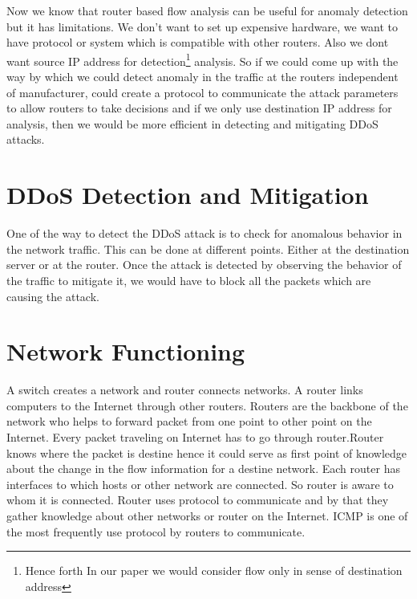 \documentclass[10pt,oneside,a4paper]{article}
\begin{document}
Now we know that router based flow analysis can be useful for anomaly detection but it has limitations. We don't want to set up expensive hardware, we want to have protocol or system which is compatible with other routers. Also we dont want source IP address for detection\footnote{Hence forth In our paper we would consider flow only in sense of destination address} analysis. So if we could come up with the way by which we could detect anomaly in the traffic at the routers independent of manufacturer, could create a protocol to communicate the attack parameters to allow routers to take decisions and if we only use destination IP address for analysis, then we would be more efficient in detecting and mitigating DDoS attacks.

\section{DDoS Detection and Mitigation}

One of the way to detect the DDoS attack is to check for anomalous behavior in the network traffic. This can be done at different points. Either at the destination server or at the router. Once the attack is detected by observing the behavior of the traffic to mitigate it, we would have to block all the packets which are causing the attack.

\section{Network Functioning}
A switch creates a network and router connects networks. A router links computers to the Internet through other routers. Routers are the backbone of the network who helps to forward packet from one point to other point on the Internet. Every packet traveling on Internet has to go through router\cite{swithcrouter}.Router knows where the packet is destine hence it could serve as first point of knowledge about the change in the flow information for a destine network. Each router has interfaces to which hosts or other network are connected. So router is aware to whom it is connected. Router uses protocol to communicate and by that they gather knowledge about other networks or router on the Internet. ICMP\cite{icmp} is one of the most frequently use protocol by routers to communicate.\par
\end{document}
